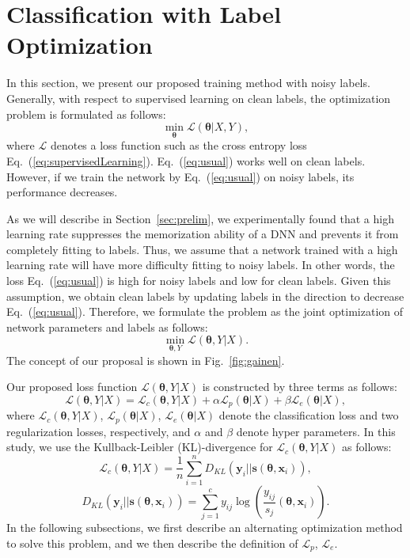 \documentclass[10pt,twocolumn,letterpaper]{article}
\newcommand{\Eref}[1]{Eq.~(\ref{#1})}
\newcommand{\Fref}[1]{Fig.~\ref{#1}}
\newcommand{\Sref}[1]{Section~\ref{#1}}
\begin{document}
\section{Classification with Label Optimization}
In this section, we present our proposed training method with noisy labels.
Generally, with respect to supervised learning on clean labels, the optimization problem is formulated as follows:
\begin{equation}\label{eq:usual}
\min_{\bm{\theta}}\mathcal{L}(\bm{\theta}|X,Y),
\end{equation}
where $\mathcal{L}$ denotes a loss function such as the cross entropy loss \Eref{eq:supervisedLearning}. \Eref{eq:usual} works well on clean labels. However, if we train the network by \Eref{eq:usual} on noisy labels, its performance decreases.

As we will describe in \Sref{sec:prelim}, we experimentally found that a high learning rate suppresses the memorization ability of a DNN and prevents it from completely fitting to labels. Thus, we assume that a network trained with a high learning rate will have more difficulty fitting to noisy labels. In other words, the loss \Eref{eq:usual} is high for noisy labels and low for clean labels. Given this assumption, we obtain clean labels by updating labels in the direction to decrease \Eref{eq:usual}. Therefore, we formulate the problem as the joint optimization of network parameters and labels as follows:
\begin{equation}\label{eq:modified}
\min_{\bm{\theta},Y}\mathcal{L}(\bm{\theta},Y|X).
\end{equation}
The concept of our proposal is shown in \Fref{fig:gainen}.

Our proposed loss function $\mathcal{L}(\bm{\theta},Y|X)$ is constructed by three terms as follows:
\begin{equation}\label{eq:all}
  \mathcal{L}(\bm{\theta},Y|X)=\mathcal{L}_c(\bm{\theta},Y|X)+\alpha\mathcal{L}_{p}(\bm{\theta}|X)+\beta\mathcal{L}_{e}(\bm{\theta}|X),
\end{equation}
where $\mathcal{L}_c(\bm{\theta},Y|X)$, $\mathcal{L}_{p}(\bm{\theta}|X)$, $\mathcal{L}_{e}(\bm{\theta}|X)$ denote the classification loss and two regularization losses, respectively, and $\alpha$ and $\beta$ denote hyper parameters.
In this study, we use the Kullback-Leibler (KL)-divergence for $\mathcal{L}_c(\bm{\theta},Y|X)$ as follows:
\begin{equation}\label{eq:KLdivergence}
\mathcal{L}_c(\bm{\theta},Y|X) = \frac{1}{n}\sum_{i=1}^n D_{KL}(\bm{y}_i||\bm{s}(\bm{\theta},\bm{x}_i)),
\end{equation}
\begin{equation}\label{eq:KLdivergence2}
D_{KL}(\bm{y}_i||\bm{s}(\bm{\theta},\bm{x}_i))=\sum_{j=1}^c y_{ij}\log\left(\frac{y_{ij}}{s_j}(\bm{\theta},\bm{x}_i)\right).
\end{equation}
In the following subsections, we first describe an alternating optimization method to solve this problem, and we then describe the definition of $\mathcal{L}_{p}$, $\mathcal{L}_{e}$.
\end{document}
